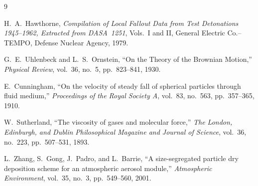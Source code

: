 \documentclass[11pt,a4paper]{article}
\begin{document}
\begin{thebibliography}{9}

H.~A.~Hawthorne,
\textit{Compilation of Local Fallout Data from Test Detonations
1945--1962, Extracted from DASA~1251},
Vols.~I and II, General Electric Co.--TEMPO, Defense Nuclear Agency,
1979.

G.~E.~Uhlenbeck and L.~S.~Ornstein,
``On the Theory of the Brownian Motion,''
\textit{Physical Review}, vol.~36, no.~5, pp.~823--841, 1930.

E.~Cunningham,
``On the velocity of steady fall of spherical particles through fluid
medium,''
\textit{Proceedings of the Royal Society A}, vol.~83, no.~563,
pp.~357--365, 1910.

W.~Sutherland,
``The viscosity of gases and molecular force,''
\textit{The London, Edinburgh, and Dublin Philosophical Magazine and
Journal of Science}, vol.~36, no.~223, pp.~507--531, 1893.

L.~Zhang, S.~Gong, J.~Padro, and L.~Barrie,
``A size-segregated particle dry deposition scheme for an atmospheric
aerosol module,''
\textit{Atmospheric Environment}, vol.~35, no.~3, pp.~549--560, 2001.

\end{thebibliography}
\end{document}
